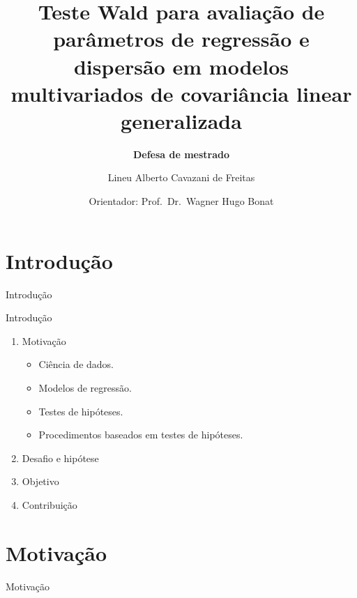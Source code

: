 \documentclass[
  ignorenonframetext,
  serif,
  professionalfont,
  usenames,
  dvipsnames,
  aspectratio = 169]{beamer}
\title{\textbf{Teste Wald para avaliação de parâmetros de regressão e dispersão em modelos multivariados de covariância linear generalizada}\newline}
\subtitle{\textbf{Defesa de mestrado}}
\author{Lineu Alberto Cavazani de Freitas\newline \and Orientador:
Prof.~Dr.~Wagner Hugo Bonat}
\date{}
\institute{PPG Informática UFPR}
\begin{document}
\frame{\titlepage}

\begin{frame}
\end{frame}

\hypertarget{introduuxe7uxe3o}{%
\section{Introdução}\label{introduuxe7uxe3o}}

\begin{frame}{Introdução}
\end{frame}

\begin{frame}{Introdução}
\protect\hypertarget{introduuxe7uxe3o-1}{}
\begin{enumerate}
    \itemsep 2ex
    
  \item Motivação
    \begin{itemize}
      \item Ciência de dados.
      \item Modelos de regressão.
      \item Testes de hipóteses.
      \item Procedimentos baseados em testes de hipóteses.
    \end{itemize}
    
  \item Desafio e hipótese
 
  \item Objetivo
 
  \item Contribuição

\end{enumerate}
\end{frame}

\hypertarget{motivauxe7uxe3o}{%
\section{Motivação}\label{motivauxe7uxe3o}}

\begin{frame}{Motivação}
\end{frame}
\end{document}
